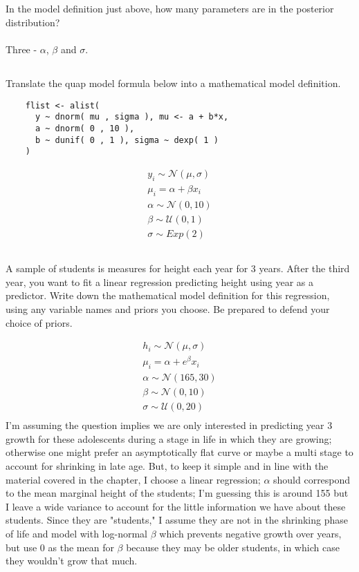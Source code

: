 \documentclass{article}
\begin{document}
\subsection{}
In the model definition just above, how many parameters are in the posterior distribution? \\~\\
Three - $\alpha$, $\beta$ and $\sigma$.

\subsection{}
Translate the quap model formula below into a mathematical model definition.
\begin{lstlisting}
    flist <- alist(
      y ~ dnorm( mu , sigma ), mu <- a + b*x,
      a ~ dnorm( 0 , 10 ),
      b ~ dunif( 0 , 1 ), sigma ~ dexp( 1 )
    )
\end{lstlisting}
\begin{gather}
    y_i \sim \mathcal{N}(\mu, \sigma) \\
    \mu_i = \alpha + \beta x_i \\
    \alpha \sim \mathcal{N}(0, 10) \\
    \beta \sim \mathcal{U}(0, 1) \\
    \sigma \sim Exp(2)
\end{gather}

\subsection{}
A sample of students is measures for height each year for 3 years. After the third year,
you want to fit a linear regression predicting height using year as a predictor. Write
down the mathematical model definition for this regression, using any variable names
and priors you choose. Be prepared to defend your choice of priors.

\begin{gather}
    h_i \sim \mathcal{N}(\mu, \sigma) \\
    \mu_i = \alpha + e^\beta x_i \\
    \alpha \sim \mathcal{N}(165, 30) \\
    \beta \sim \mathcal{N}(0, 10) \\
    \sigma \sim \mathcal{U}(0, 20) \\
\end{gather}
I'm assuming the question implies we are only interested in predicting year 3 growth for
these adolescents during a stage in life in which they are growing; otherwise one might
prefer an asymptotically flat curve or maybe a multi stage to account for shrinking in
late age. But, to keep it simple and in line with the material covered in the chapter,
I choose a linear regression; $\alpha$ should correspond to the mean marginal height of
the students; I'm guessing this is around 155 but I leave a wide variance to account for
the little information we have about these students. Since they are "students," I
assume they are not in the shrinking phase of life and model with log-normal $\beta$
which prevents negative growth over years, but use 0 as the mean for $\beta$ because
they may be older students, in which case they wouldn't grow that much.
\end{document}
